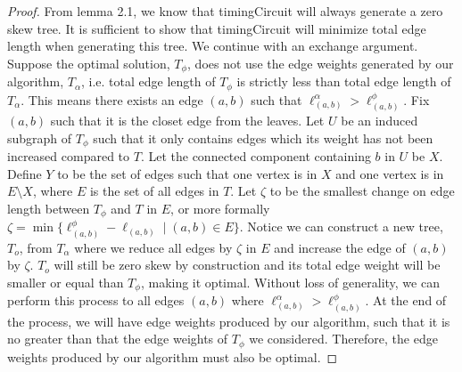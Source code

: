 \documentclass[11pt]{scrartcl}
\begin{document}
	\begin{proof}
		From lemma 2.1, we know that timingCircuit will always generate a zero skew tree.
		It is sufficient to show that timingCircuit will minimize total edge length when
		generating this tree. %
		We continue with an exchange argument.
		Suppose the optimal solution, $T_\phi$, does not use the edge weights generated by our algorithm, $T_\alpha$,
		i.e. total edge length of $T_\phi$ is strictly less than total edge length of $T_\alpha$.
		This means there exists an edge $(a,b)$ such that $\ell^\alpha_{(a,b)} > \ell^\phi_{(a,b)}$.
		Fix $(a,b)$ such that it is the closet edge from the leaves.
		Let $U$ be an induced subgraph of $T_\phi$ such that it only contains edges
		which its weight has not been increased compared to $T$. Let the connected component
		containing $b$ in $U$ be $X$.
		Define $Y$ to be the set of edges such that one vertex is in $X$ and one vertex is in $E \setminus X$,
		where $E$ is the set of all edges in $T$. Let $\zeta$ to be the smallest
		change on edge length between $T_\phi$ and $T$ in $E$, or more formally
		$\zeta = \min\{\ell^\phi_{(a,b)} - \ell_{(a,b)}  \mid (a,b) \in E \} $.
		Notice we can construct a new tree, $T_o$, from $T_\alpha$ where we reduce all edges by $\zeta$
		in $E$ and increase the edge of $(a,b)$ by $\zeta$. $T_o$ will still be zero skew by construction
		and its total edge weight will be smaller or equal than $T_\phi$, making it optimal.
		Without loss of generality, we can perform this process to all edges $(a,b)$ where
		$\ell^\alpha_{(a,b)} > \ell^\phi_{(a,b)}$.
		At the end of the process, we will have edge weights produced by our algorithm,
		such that it is no greater than that the edge weights of $T_\phi$ we considered.
		Therefore, the edge weights produced by our algorithm must also be optimal.


	\end{proof}








\fi
\end{document}
